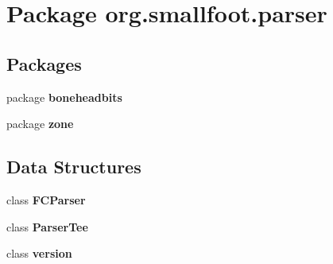 \section{Package org.\-smallfoot.\-parser}
\label{namespaceorg_1_1smallfoot_1_1parser}
\subsection*{Packages}
\begin{DoxyCompactItemize}
\item 
package {\bf boneheadbits}
\item 
package {\bf zone}
\end{DoxyCompactItemize}
\subsection*{Data Structures}
\begin{DoxyCompactItemize}
\item 
class {\bf F\-C\-Parser}
\item 
class {\bf Parser\-Tee}
\item 
class {\bf version}
\end{DoxyCompactItemize}
